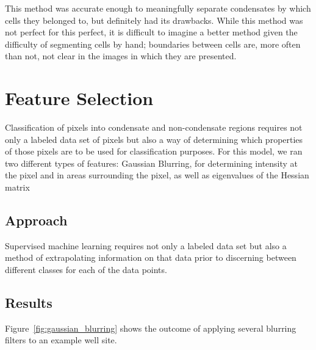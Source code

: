 \documentclass[11pt]{article}
\begin{document}
This method was accurate enough to meaningfully separate condensates by which cells they belonged
to, but definitely had its drawbacks. While this method was not perfect for this perfect, it is
difficult to imagine a better method given the difficulty of segmenting cells by hand; boundaries
between cells are, more often than not, not clear in the images in which they are presented. 

\section{Feature Selection}
Classification of pixels into condensate and non-condensate regions requires not only a labeled data
set of pixels but also a way of determining which properties of those pixels are to be used for
classification purposes. For this model, we ran two different types of features: Gaussian Blurring,
for determining intensity at the pixel and in areas surrounding the pixel, as well as eigenvalues of
the Hessian matrix 

\subsection{Approach}

Supervised machine learning requires not only a labeled data set but also a method of extrapolating
information on that data prior to discerning between different classes for each of the data points. 

\subsection{Results}

Figure~\ref{fig:gaussian_blurring} shows the outcome of applying several blurring filters to an 
example well site.
\end{document}
